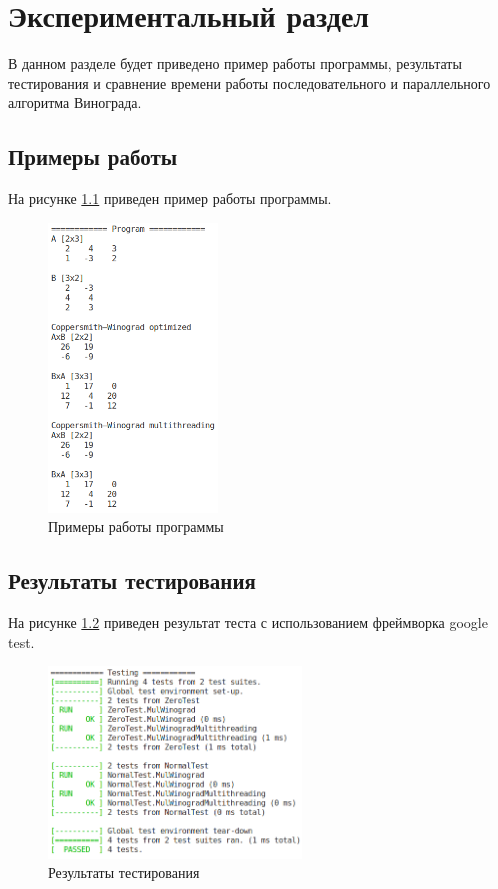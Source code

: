 \chapter{Экспериментальный раздел}
\label{cha:research}

В данном разделе будет приведено пример работы программы,
результаты тестирования и сравнение времени работы
последовательного и параллельного алгоритма Винограда.

\section{Примеры работы}
На рисунке \ref{fig:4.1} приведен пример работы программы.

\begin{figure}[h]
    \centering
    \includegraphics[width=0.4\textwidth]{4/inc/e1.png}
    \caption{Примеры работы программы}
    \label{fig:4.1}
\end{figure}


\section{Результаты тестирования}

На рисунке \ref{fig:4.2} приведен результат теста с использованием фреймворка google test.

\begin{figure}[h]
    \centering
    \includegraphics[width=0.6\textwidth]{4/inc/test.png}
    \caption{Результаты тестирования}
    \label{fig:4.2}
\end{figure}


